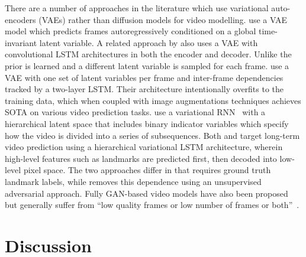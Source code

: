 There are a number of approaches in the literature which use variational auto-encoders (VAEs) rather than diffusion models for video modelling. \citet{babaeizadeh2017stochastic} use a VAE model which predicts frames autoregressively conditioned on a global time-invariant latent variable. A related approach by \citet{denton2018stochastic} also uses a VAE with convolutional LSTM architectures in both the encoder and decoder. Unlike \citet{babaeizadeh2017stochastic} the prior is learned and a different latent variable is sampled for each frame. \citet{babaeizadeh2021fitvid} use a VAE with one set of latent variables per frame and inter-frame dependencies tracked by a two-layer LSTM. Their architecture intentionally overfits to the training data, which when coupled with image augmentations techniques achieves SOTA on various video prediction tasks.  \citet{kim2019variational} use a variational RNN~\citep{chung2015recurrent} with a hierarchical latent space that includes binary indicator variables which specify how the video is divided into a series of subsequences. Both \citet{villegas2018hierarchical} and \citet{wichers2018learning} target long-term video prediction using a hierarchical variational LSTM architecture, wherein high-level features such as landmarks are predicted first, then decoded into low-level pixel space. The two approaches differ in that \citet{villegas2018hierarchical} requires ground truth landmark labels, while \cite{wichers2018learning} removes this dependence using an unsupervised adversarial approach. Fully GAN-based video models have also been proposed~\citep{aldausari2022video,clark2019adversarial} but generally suffer from ``low quality frames or low number of frames or both''~\citep{aldausari2022video}.

\section{Discussion}

